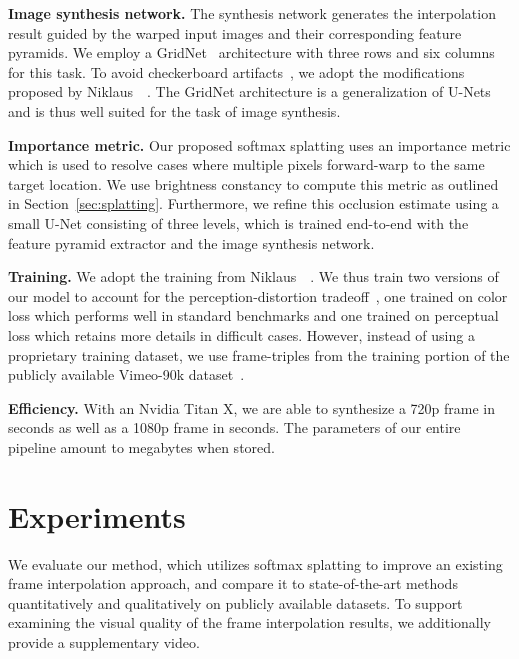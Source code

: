 \documentclass[10pt,twocolumn,letterpaper]{article}
\begin{document}
\vspace{0.05in}
\noindent\textbf{Image synthesis network.} The synthesis network generates the interpolation result guided by the warped input images and their corresponding feature pyramids. We employ a GridNet~\cite{Fourure_BMVC_2017} architecture with three rows and six columns for this task. To avoid checkerboard artifacts~\cite{Odena_OTHER_2016}, we adopt the modifications proposed by Niklaus~\etal~\cite{Niklaus_CVPR_2018}. The GridNet architecture is a generalization of U-Nets and is thus well suited for the task of image synthesis.

\vspace{0.05in}
\noindent\textbf{Importance metric.} Our proposed softmax splatting uses an importance metric  which is used to resolve cases where multiple pixels forward-warp to the same target location. We use brightness constancy to compute this metric as outlined in Section~\ref{sec:splatting}. Furthermore, we refine this occlusion estimate using a small U-Net consisting of three levels, which is trained end-to-end with the feature pyramid extractor and the image synthesis network.

\vspace{0.05in}
\noindent\textbf{Training.} We adopt the training from Niklaus~\etal~\cite{Niklaus_CVPR_2018}. We thus train two versions of our model to account for the perception-distortion tradeoff~\cite{Blau_CVPR_2018}, one trained on color loss  which performs well in standard benchmarks and one trained on perceptual loss  which retains more details in difficult cases. However, instead of using a proprietary training dataset, we use frame-triples from the training portion of the publicly available Vimeo-90k dataset~\cite{Xue_IJCV_2019}.

\vspace{0.05in}
\noindent\textbf{Efficiency.} With an Nvidia Titan X, we are able to synthesize a 720p frame in  seconds as well as a 1080p frame in  seconds. The parameters of our entire pipeline amount to  megabytes when stored. 
\section{Experiments}
\label{sec:experiments}
We evaluate our method, which utilizes softmax splatting to improve an existing frame interpolation approach, and compare it to state-of-the-art methods quantitatively and qualitatively on publicly available datasets. To support examining the visual quality of the frame interpolation results, we additionally provide a supplementary video.
\end{document}
